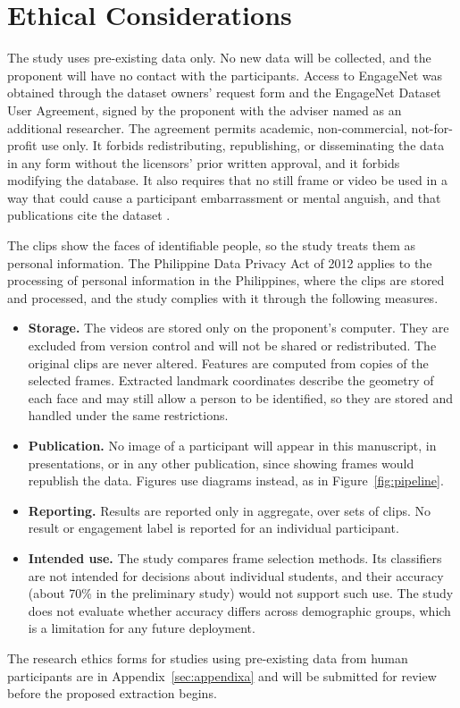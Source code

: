 \section{Ethical Considerations}
\label{sec:ethics}

The study uses pre-existing data only. No new data will be collected, and the proponent will have no contact with the participants. Access to EngageNet was obtained through the dataset owners' request form and the EngageNet Dataset User Agreement, signed by the proponent with the adviser named as an additional researcher. The agreement permits academic, non-commercial, not-for-profit use only. It forbids redistributing, republishing, or disseminating the data in any form without the licensors' prior written approval, and it forbids modifying the database. It also requires that no still frame or video be used in a way that could cause a participant embarrassment or mental anguish, and that publications cite the dataset \cite{singh2023}.

The clips show the faces of identifiable people, so the study treats them as personal information. The Philippine Data Privacy Act of 2012 \cite{ra10173} applies to the processing of personal information in the Philippines, where the clips are stored and processed, and the study complies with it through the following measures.

\begin{itemize}
   \item \textbf{Storage.} The videos are stored only on the proponent's computer. They are excluded from version control and will not be shared or redistributed. The original clips are never altered. Features are computed from copies of the selected frames. Extracted landmark coordinates describe the geometry of each face and may still allow a person to be identified, so they are stored and handled under the same restrictions.
   \item \textbf{Publication.} No image of a participant will appear in this manuscript, in presentations, or in any other publication, since showing frames would republish the data. Figures use diagrams instead, as in Figure~\ref{fig:pipeline}.
   \item \textbf{Reporting.} Results are reported only in aggregate, over sets of clips. No result or engagement label is reported for an individual participant.
   \item \textbf{Intended use.} The study compares frame selection methods. Its classifiers are not intended for decisions about individual students, and their accuracy (about 70\% in the preliminary study) would not support such use. The study does not evaluate whether accuracy differs across demographic groups, which is a limitation for any future deployment.
\end{itemize}

The research ethics forms for studies using pre-existing data from human participants are in Appendix~\ref{sec:appendixa} and will be submitted for review before the proposed extraction begins.
